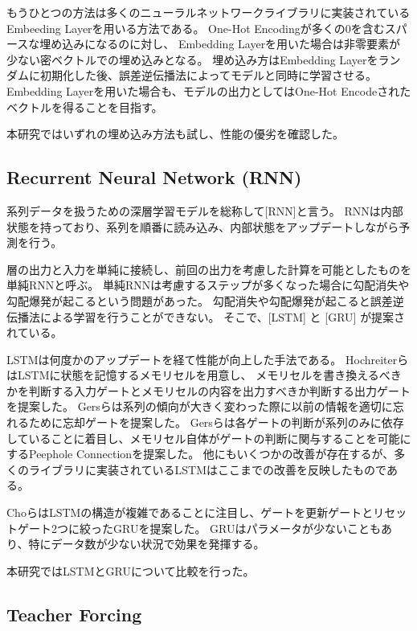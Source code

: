 もうひとつの方法は多くのニューラルネットワークライブラリに実装されているEmbeeding Layerを用いる方法である。
One-Hot Encodingが多くの0を含むスパースな埋め込みになるのに対し、
Embedding Layerを用いた場合は非零要素が少ない密ベクトルでの埋め込みとなる。
埋め込み方はEmbedding Layerをランダムに初期化した後、誤差逆伝播法によってモデルと同時に学習させる。
Embedding Layerを用いた場合も、モデルの出力としてはOne-Hot Encodeされたベクトルを得ることを目指す。

本研究ではいずれの埋め込み方法も試し、性能の優劣を確認した。

\subsection{Recurrent Neural Network (RNN)}

系列データを扱うための深層学習モデルを総称して[RNN]と言う。
RNNは内部状態を持っており、系列を順番に読み込み、内部状態をアップデートしながら予測を行う。

層の出力と入力を単純に接続し、前回の出力を考慮した計算を可能としたものを単純RNN\cite{simple_rnn}と呼ぶ。
単純RNNは考慮するステップが多くなった場合に勾配消失や勾配爆発が起こるという問題があった。
勾配消失や勾配爆発が起こると誤差逆伝播法による学習を行うことができない。
そこで、[LSTM] \cite{lstm_original, lstm_forget_gate, lstm_peephole}と
[GRU] \cite{gru}が提案されている。

LSTMは何度かのアップデートを経て性能が向上した手法である。
HochreiterらはLSTMに状態を記憶するメモリセルを用意し、
メモリセルを書き換えるべきかを判断する入力ゲートとメモリセルの内容を出力すべきか判断する出力ゲートを提案した\cite{lstm_original}。
Gersらは系列の傾向が大きく変わった際に以前の情報を適切に忘れるために忘却ゲートを提案した\cite{lstm_forget_gate}。
Gersらは各ゲートの判断が系列のみに依存していることに着目し、メモリセル自体がゲートの判断に関与することを可能にするPeephole Connectionを提案した\cite{lstm_peephole}。
他にもいくつかの改善が存在するが、多くのライブラリに実装されているLSTMはここまでの改善を反映したものである。

ChoらはLSTMの構造が複雑であることに注目し、ゲートを更新ゲートとリセットゲート2つに絞ったGRUを提案した\cite{gru}。
GRUはパラメータが少ないこともあり、特にデータ数が少ない状況で効果を発揮する。

本研究ではLSTMとGRUについて比較を行った。

\subsection{Teacher Forcing} \label{teacher_forcing}

